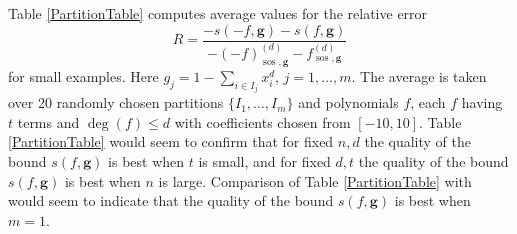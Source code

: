 \documentclass{amsart}
\theoremstyle{definition}
\begin{document}
Table \ref{PartitionTable} computes average values for the relative error
\[
	R=  \frac{-s(-f,\mathbf{g})-s(f,\mathbf{g})}{-(-f)_{\operatorname{sos},\mathbf{g}}^{(d)}-f_{\operatorname{sos},\mathbf{g}}^{(d)}}
\]
for small examples. Here $g_j = 1 - \sum_{i\in I_j} x_i^d$, $j=1,\dots,m$.
The average is taken over 20 randomly chosen partitions $\{I_1,\dots,I_m\}$ and  polynomials $f$, each $f$ having $t$ terms and $\deg(f)\le d$ with coefficients chosen from $[-10,10]$. Table \ref{PartitionTable} would seem to confirm that for fixed $n,d$
the quality of the bound $s(f,\mathbf{g})$ is best when $t$ is small, and for fixed $d,t$ the quality of the bound $s(f,\mathbf{g})$
is best when $n$ is large.  Comparison of Table \ref{PartitionTable} with \cite[Table 3]{gha-lass-mar} would seem to indicate
that the quality of the bound $s(f,\mathbf{g})$ is best when $m=1$.
%
\end{document}
